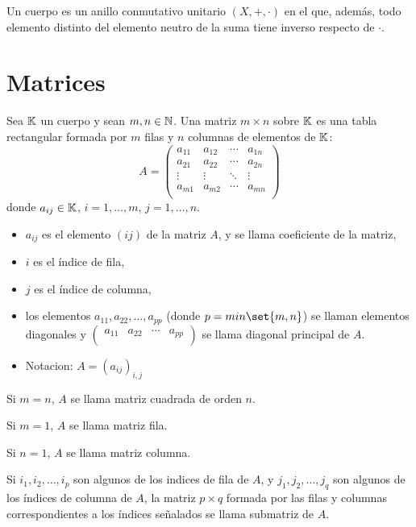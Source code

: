 \begin{definition}[Cuerpo]
	Un cuerpo es un anillo conmutativo unitario \((X, +, \cdot )\) en el que, además, todo elemento distinto del elemento neutro de la suma tiene inverso respecto de \(\cdot \).
\end{definition}

\section{Matrices}

\begin{definition}
	Sea \(\mathbb{K} \) un cuerpo y sean \(m,n \in \mathbb{N} \). Una matriz \(m \times n \) sobre \(\mathbb{K} \) es una tabla rectangular formada por \(m \) filas y \(n \) columnas de elementos de \(\mathbb{K}\):
	\[
		A = \begin{pmatrix}
			a_{11} & a_{12} & \cdots & a_{1n } \\
			a_{21} & a_{22} & \cdots & a_{2n}  \\
			\vdots & \vdots & \ddots & \vdots  \\
			a_{m1} & a_{m2} & \cdots & a_{mn}  \\
		\end{pmatrix}
	\]
	donde \(a_{ij} \in \mathbb{K} \), \(i = 1, \ldots, m \), \(j = 1,\ldots,n \).
	\begin{itemize}
		\item \(a_{ij}\) es el elemento \((ij )\) de la matriz \(A \), y se llama coeficiente de la matriz,
		\item \(i \) es el índice de fila,
		\item \(j \) es el índice de columna,
		\item los elementos \(a_{11}, a_{22}, \ldots, a_{pp}\) (donde \(p = min\set{m,n}\)) se llaman elementos diagonales y \(\begin{pmatrix}
			      a_{11 } & a_{22 } & \cdots & a_{pp } \\
		      \end{pmatrix}\) se llama diagonal principal de \(A\).
		\item Notacion: \(A = (a_{ij})_{i,j}\)
	\end{itemize}
\end{definition}

Si \(m =n \), \(A \) se llama matriz cuadrada de orden \(n \).

Si \(m = 1 \), \(A \) se llama matriz fila.

Si \(n = 1 \), \(A \) se llama matriz columna.

Si \(i_1, i_2, \ldots, i_p \) son algunos de los indices de fila de \(A \), y \(j_1, j_2, \ldots, j_q \) son algunos de los índices de columna de \(A \), la matriz \(p \times q \) formada por las filas y columnas correspondientes a los índices señalados se llama submatriz de \(A \).

